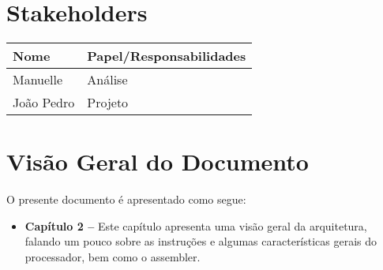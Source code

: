 \documentclass{report}
\begin{document}
  \section{Stakeholders}
    \FloatBarrier
    \begin{table}[H] 
      \begin{center}
        \begin{tabular}[pos]{|m{6cm} | m{8cm}|} 
          \hline 
          \cellcolor[gray]{0.9}\textbf{Nome} & \cellcolor[gray]{0.9}\textbf{Papel/Responsabilidades} \\ \hline 
          Manuelle	& Análise \\  \hline 
          João Pedro	& Projeto \\  \hline 
        \end{tabular}
      \end{center}
    \end{table} 

\section{Visão Geral do Documento}

O presente documento é apresentado como segue:

  \begin{itemize}
   \item \textbf{Capítulo 2 --} Este capítulo apresenta uma visão geral da arquitetura, falando um pouco sobre as instruções e algumas características gerais do processador, bem como o assembler.
  \end{itemize}


\end{document}
